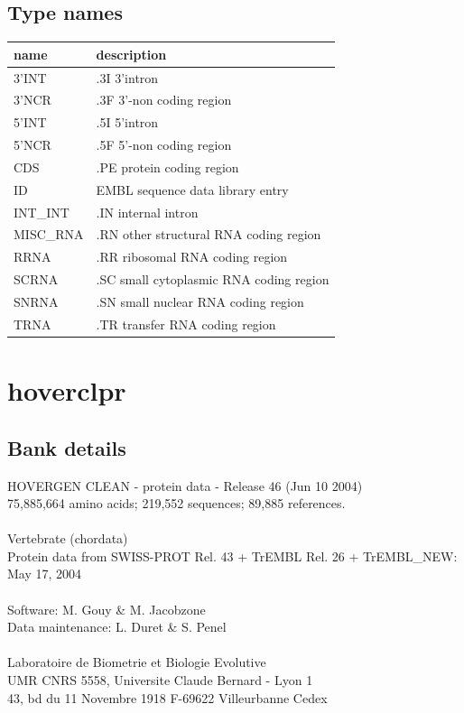\documentclass{article}
\begin{document}
\begin{Schunk}
\subsection{Type names}
\noindent\begin{tabular}{ll}
\hline \hline
name & description\\
\hline
3'INT & .3I 3'intron \\
3'NCR & .3F  3'-non coding region \\
5'INT & .5I 5'intron \\
5'NCR & .5F  5'-non coding region \\
CDS & .PE protein coding region \\
ID & EMBL sequence data library entry \\
INT\_INT & .IN  internal intron \\
MISC\_RNA & .RN other structural RNA coding region \\
RRNA & .RR ribosomal RNA coding region \\
SCRNA & .SC small cytoplasmic RNA coding region \\
SNRNA & .SN small nuclear RNA coding region \\
TRNA & .TR transfer RNA coding region \\
\hline \hline
\end{tabular}

\section{ hoverclpr }
\subsection{Bank details}
HOVERGEN CLEAN - protein data - Release 46 (Jun 10 2004)\\
75,885,664 amino acids; 219,552 sequences; 89,885 references.\\
\\
Vertebrate (chordata)	\\
Protein data from SWISS-PROT Rel. 43  + TrEMBL Rel. 26 + TrEMBL\_NEW: May 17, 2004\\
\\
Software: M. Gouy \& M. Jacobzone\\
Data maintenance: L. Duret \& S. Penel\\
\\
Laboratoire de Biometrie et Biologie Evolutive\\
UMR CNRS 5558, Universite Claude Bernard - Lyon 1\\
43, bd du 11 Novembre 1918 F-69622 Villeurbanne Cedex\\



\end{Schunk}
\end{document}
